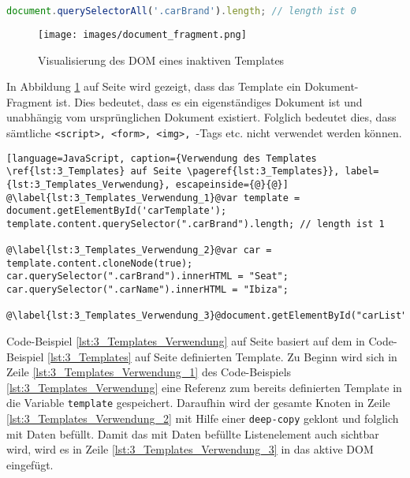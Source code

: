 \begin{lstlisting}[language=JavaScript, caption={Beispiel-Selektor eines Elements in einem Template, das nicht aktiven DOM ist}, label={lst:3_Selector_Example}]
  document.querySelectorAll('.carBrand').length; // length ist 0
\end{lstlisting}

\begin{figure}[h]
\centering
\texttt{[image: images/document\_fragment.png]}
\caption[
Visualisierung des DOM eines inaktiven Templates, Urldate: 04.2014
\newline
\small\texttt{\url{http://www.prevent-default.com/wp-content/uploads/2013/04/document-fragment-300x132.png}}
]{Visualisierung des DOM eines inaktiven Templates}
\label{fig:3_inactive_Template_DOM}
\end{figure}

In Abbildung \ref{fig:3_inactive_Template_DOM} auf Seite \pageref{fig:3_inactive_Template_DOM} wird gezeigt, dass das Template ein Dokument-Fragment ist. Dies bedeutet, dass es ein eigenständiges Dokument ist und unabhängig vom ursprünglichen Dokument existiert. Folglich bedeutet dies, dass sämtliche \lstinline|<script>, <form>, <img>, |-Tags etc. nicht verwendet werden können.

\begin{lstlisting}[language=JavaScript, caption={Verwendung des Templates \ref{lst:3_Templates} auf Seite \pageref{lst:3_Templates}}, label={lst:3_Templates_Verwendung}, escapeinside={@}{@}]
@\label{lst:3_Templates_Verwendung_1}@var template = document.getElementById('carTemplate');
template.content.querySelector(".carBrand").length; // length ist 1

@\label{lst:3_Templates_Verwendung_2}@var car = template.content.cloneNode(true);
car.querySelector(".carBrand").innerHTML = "Seat";
car.querySelector(".carName").innerHTML = "Ibiza";

@\label{lst:3_Templates_Verwendung_3}@document.getElementById("carList").appendChild(car);
\end{lstlisting}

Code-Beispiel \ref{lst:3_Templates_Verwendung} auf Seite \pageref{lst:3_Templates_Verwendung} basiert auf dem in Code-Beispiel \ref{lst:3_Templates} auf Seite \pageref{lst:3_Templates} definierten Template. Zu Beginn wird sich in Zeile \ref{lst:3_Templates_Verwendung_1} des Code-Beispiels \ref{lst:3_Templates_Verwendung} eine Referenz zum bereits definierten Template in die Variable \lstinline|template| gespeichert. Daraufhin wird der gesamte Knoten in Zeile \ref{lst:3_Templates_Verwendung_2} mit Hilfe einer \lstinline|deep-copy| geklont und folglich mit Daten befüllt. Damit das mit Daten befüllte Listenelement auch sichtbar wird, wird es in Zeile \ref{lst:3_Templates_Verwendung_3} in das aktive DOM eingefügt.
